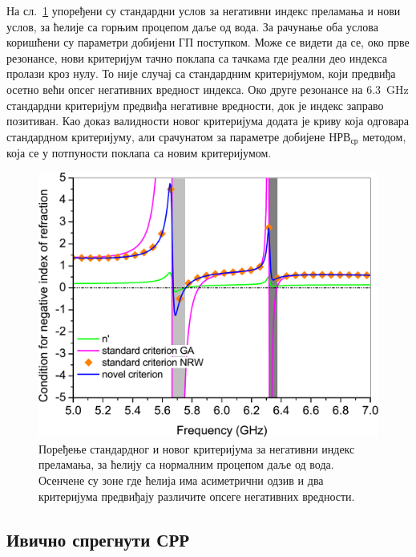 На сл.~\ref{usl_norm} упоређени су стандардни услов за негативни индекс преламања и нови услов, за ћелије са горњим процепом даље од вода. За рачунање оба услова коришћени су параметри добијени ГП поступком. Може се видети да се, око прве резонансе, нови критеријум тачно поклапа са тачкама где реални део индекса пролази кроз нулу. То није случај са стандардним критеријумом, који предвиђа осетно већи опсег негативних вредност индекса. Око друге резонансе на \SI{6.3}{\giga\hertz} стандардни критеријум предвиђа негативне вредности, док је индекс заправо позитиван. Као доказ валидности новог критеријума додата је криву која одговара стандардном критеријуму, али срачунатом за параметре добијене $НРВ_{ср}$ методом, која се у потпуности поклапа са новим критеријумом.
\begin{figure}[!t]
\centering
\includegraphics[scale=\SkalaC]{slike/usl_norm.pdf}
\caption{Поређење стандардног и новог критеријума за негативни индекс преламања, за ћелију са нормалним процепом даље од вода. Осенчене су зоне где ћелија има асиметрични одзив и два критеријума предвиђају различите опсеге негативних вредности.}
\label{usl_norm}
\end{figure}

\subsection{Ивично спрегнути СРР}%

